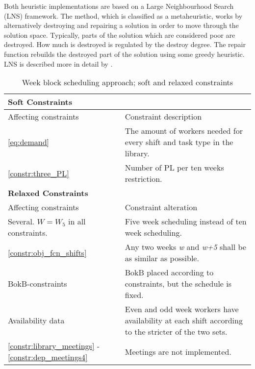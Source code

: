 Both heuristic implementations are based on a Large Neighbourhood Search (LNS) framework. The method, which is classified as a metaheuristic, works by alternatively destroying and repairing a solution in order to move through the solution space. Typically, parts of the solution which are considered poor are destroyed. How much is destroyed is regulated by the destroy degree. The repair function rebuilds the destroyed part of the solution using some greedy heuristic. LNS is described more in detail by \citet{pisinger_2010}.

\begin{table}[!h]
\centering
\caption{Week block scheduling approach; soft and relaxed constraints}
\label{tab:weekly_task_constraints}
\begin{tabular}{|p{4cm}|p{7cm}|}
\hline
\multicolumn{2}{|l|}{\cellcolor{gray!90} \textbf{Soft Constraints}} \\
\hline 
\rowcolor{Gray} Affecting constraints & Constraint description \\ \hline
\ref{eq:demand} & The amount of workers needed for every shift and task type in the library.  \\ \hline
\ref{constr:three_PL} & Number of PL per ten weeks restriction. \\ \hline
\multicolumn{2}{|l|}{\cellcolor{gray!90} \textbf{Relaxed Constraints}} \\
\hline 
\rowcolor{Gray} Affecting constraints & Constraint alteration \\ \hline
Several. $W = W_5$ in all constraints. & Five week scheduling instead of ten week scheduling. \\ \hline
\ref{constr:obj_fcn_shifts} & Any two weeks \textit{w} and \textit{w+5} shall be as similar as possible. \\ \hline
BokB-constraints & BokB placed according to constraints, but the schedule is fixed. \\ \hline
Availability data & Even and odd week workers have availability at each shift according to the stricter of the two sets. \\ \hline
\ref{constr:library_meetings} - \ref{constr:dep_meetings4} & Meetings are not implemented. \\ \hline
\end{tabular}
\end{table}


